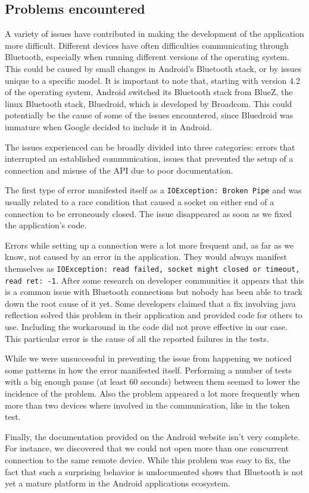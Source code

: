 \subsection{Problems encountered}
A variety of issues have contributed in making the development of the application more difficult.
Different devices have often difficulties communicating through Bluetooth, especially when running different versions of the operating system. This could be caused by small changes in Android's Bluetooth stack, or by issues unique to a specific model.
It is important to note that, starting with version 4.2 of the operating system, Android switched its Bluetooth stack from BlueZ, the linux Bluetooth stack, Bluedroid, which is developed by Broadcom. This could potentially be the cause of some of the issues encountered, since Bluedroid was immature when Google decided to include it in Android.

The issues experienced can be broadly divided into three categories: errors that interrupted an established communication, issues that prevented the setup of a connection and misuse of the API due to poor documentation.

The first type of error manifested itself as a \texttt{IOException: Broken Pipe} and was usually related to a race condition that caused a socket on either end of a connection to be erroneously closed.
The issue disappeared as soon as we fixed the application's code.

Errors while setting up a connection were a lot more frequent and, as far as we know, not caused by an error in the application.
They would always manifest themselves as \texttt{IOException: read failed, socket might closed or timeout, read ret: -1}.
After some research on developer communities it appears that this is a common issue with Bluetooth connections but nobody has been able to track down the root cause of it yet.
Some developers claimed that a fix involving java reflection solved this problem in their application and provided code for others to use.
Including the workaround in the code did not prove effective in our case.
This particular error is the cause of all the reported failures in the tests.

While we were unsuccessful in preventing the issue from happening we noticed some patterns in how the error manifested itself.
Performing a number of tests with a big enough pause (at least 60 seconds) between them seemed to lower the incidence of the problem.
Also the problem appeared a lot more frequently when more than two devices where involved in the communication, like in the token test.

Finally, the documentation provided on the Android website isn't very complete.
For instance, we discovered that we could not open more than one concurrent connection to the same remote device.
While this problem was easy to fix, the fact that such a surprising behavior is undocumented shows that Bluetooth is not yet a mature platform in the Android applications ecosystem.
